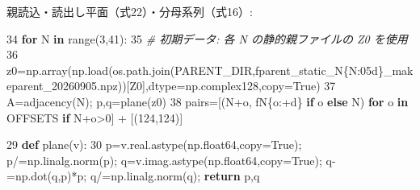 \documentclass[
  a4paper,
]{ltjsarticle}
\newenvironment{Shaded}{}{}
\newcommand{\BuiltInTok}[1]{\textcolor[rgb]{0.00,0.50,0.00}{#1}}
\newcommand{\CommentTok}[1]{\textcolor[rgb]{0.38,0.63,0.69}{\textit{#1}}}
\newcommand{\ControlFlowTok}[1]{\textcolor[rgb]{0.00,0.44,0.13}{\textbf{#1}}}
\newcommand{\DecValTok}[1]{\textcolor[rgb]{0.25,0.63,0.44}{#1}}
\newcommand{\KeywordTok}[1]{\textcolor[rgb]{0.00,0.44,0.13}{\textbf{#1}}}
\newcommand{\NormalTok}[1]{#1}
\newcommand{\OperatorTok}[1]{\textcolor[rgb]{0.40,0.40,0.40}{#1}}
\newcommand{\SpecialCharTok}[1]{\textcolor[rgb]{0.25,0.44,0.63}{#1}}
\newcommand{\SpecialStringTok}[1]{\textcolor[rgb]{0.73,0.40,0.53}{#1}}
\newcommand{\StringTok}[1]{\textcolor[rgb]{0.25,0.44,0.63}{#1}}
\newcommand{\VariableTok}[1]{\textcolor[rgb]{0.10,0.09,0.49}{#1}}
\begin{document}
親読込・読出し平面（式22）・分母系列（式16）:

\begin{Shaded}
\begin{Highlighting}[]
    \DecValTok{34}  \ControlFlowTok{for}\NormalTok{ N }\KeywordTok{in} \BuiltInTok{range}\NormalTok{(}\DecValTok{3}\NormalTok{,}\DecValTok{41}\NormalTok{):}
    \DecValTok{35}      \CommentTok{\# 初期データ: 各 N の静的親ファイルの Z0 を使用}
    \DecValTok{36}\NormalTok{      z0}\OperatorTok{=}\NormalTok{np.array(np.load(os.path.join(PARENT\_DIR,}\SpecialStringTok{f\textquotesingle{}parent\_static\_N}\SpecialCharTok{\{}\NormalTok{N}\SpecialCharTok{:05d\}}\SpecialStringTok{\_makeparent\_20260905.npz\textquotesingle{}}\NormalTok{))[}\StringTok{\textquotesingle{}Z0\textquotesingle{}}\NormalTok{],dtype}\OperatorTok{=}\NormalTok{np.complex128,copy}\OperatorTok{=}\VariableTok{True}\NormalTok{)}
    \DecValTok{37}\NormalTok{      A}\OperatorTok{=}\NormalTok{adjacency(N)}\OperatorTok{;}\NormalTok{ p,q}\OperatorTok{=}\NormalTok{plane(z0)}
    \DecValTok{38}\NormalTok{      pairs}\OperatorTok{=}\NormalTok{[(N}\OperatorTok{+}\NormalTok{o, }\SpecialStringTok{f\textquotesingle{}N}\SpecialCharTok{\{}\NormalTok{o}\SpecialCharTok{:+d\}}\SpecialStringTok{\textquotesingle{}} \ControlFlowTok{if}\NormalTok{ o }\ControlFlowTok{else} \StringTok{\textquotesingle{}N\textquotesingle{}}\NormalTok{) }\ControlFlowTok{for}\NormalTok{ o }\KeywordTok{in}\NormalTok{ OFFSETS }\ControlFlowTok{if}\NormalTok{ N}\OperatorTok{+}\NormalTok{o}\OperatorTok{\textgreater{}}\DecValTok{0}\NormalTok{] }\OperatorTok{+}\NormalTok{ [(}\DecValTok{124}\NormalTok{,}\StringTok{\textquotesingle{}124\textquotesingle{}}\NormalTok{)]}
\end{Highlighting}
\end{Shaded}

\begin{Shaded}
\begin{Highlighting}[]
    \DecValTok{29}  \KeywordTok{def}\NormalTok{ plane(v):}
    \DecValTok{30}\NormalTok{      p}\OperatorTok{=}\NormalTok{v.real.astype(np.float64,copy}\OperatorTok{=}\VariableTok{True}\NormalTok{)}\OperatorTok{;}\NormalTok{ p}\OperatorTok{/=}\NormalTok{np.linalg.norm(p)}\OperatorTok{;}\NormalTok{ q}\OperatorTok{=}\NormalTok{v.imag.astype(np.float64,copy}\OperatorTok{=}\VariableTok{True}\NormalTok{)}\OperatorTok{;}\NormalTok{ q}\OperatorTok{{-}=}\NormalTok{np.dot(q,p)}\OperatorTok{*}\NormalTok{p}\OperatorTok{;}\NormalTok{ q}\OperatorTok{/=}\NormalTok{np.linalg.norm(q)}\OperatorTok{;} \ControlFlowTok{return}\NormalTok{ p,q}
\end{Highlighting}
\end{Shaded}
\end{document}
